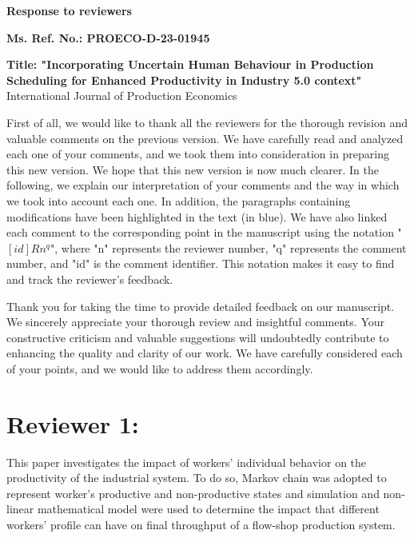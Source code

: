 \documentclass[preprint,11pt,3p]{elsarticle}
\begin{document}
\begin{center}
	\begin{huge}  
		\textbf{ \quad \quad Response to reviewers}
	\end{huge}  
	\newline
	\newline
	\textbf{Ms. Ref. No.: PROECO-D-23-01945}
			
	\textbf{Title: "Incorporating Uncertain Human Behaviour in Production Scheduling for Enhanced Productivity in Industry 5.0 context" } 
 \newline
 International Journal of Production Economics 
	
\end{center}

First of all, we would like to thank all the reviewers for the thorough revision and valuable comments on the previous version. We have carefully read and analyzed each one of your comments, and we took them into consideration in preparing this new version. We hope that this new version is now much clearer. In the following, we explain our interpretation of your comments and the way in which we took into account each one. In addition, the paragraphs containing modifications have been highlighted in the text (in blue). We have also linked each comment to the corresponding point in the manuscript using the notation "$[id]Rn^{q}$", where "n" represents the reviewer number, "q" represents the comment number, and "id" is the comment identifier. This notation makes it easy to find and track the reviewer's feedback.





\newpage 
Thank you for taking the time to provide detailed feedback on our manuscript. We sincerely appreciate your thorough review and insightful comments. Your constructive criticism and valuable suggestions will undoubtedly contribute to enhancing the quality and clarity of our work. We have carefully considered each of your points, and we would like to address them accordingly.
\section{Reviewer 1: }
This paper investigates the impact of workers' individual behavior on the productivity of the industrial system. To do so, Markov chain was adopted to represent worker's productive and non-productive states and simulation and non-linear mathematical model were used to determine the impact that different workers' profile can have on final throughput of a flow-shop production system.
\end{document}
